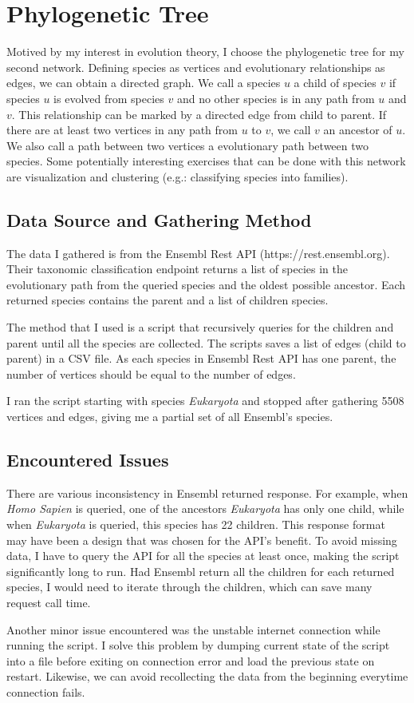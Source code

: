 \documentclass[10pt]{article}
\begin{document}
\section{Phylogenetic Tree}

Motived by my interest in evolution theory, I choose the phylogenetic tree for my second network. Defining species as vertices and evolutionary relationships as edges, we can obtain a directed graph. We call a species $u$ a child of species $v$ if species $u$ is evolved from species $v$ and no other species is in any path from $u$ and $v$. This relationship can be marked by a directed edge from child to parent. If there are at least two vertices in any path from $u$ to $v$, we call $v$ an ancestor of $u$. We also call a path between two vertices a evolutionary path between two species. Some potentially interesting exercises that can be done with this network are visualization and clustering (e.g.: classifying species into families). 

\subsection{Data Source and Gathering Method}

The data I gathered is from the Ensembl Rest API (https://rest.ensembl.org). Their taxonomic classification endpoint returns a list of species in the evolutionary path from the queried species and the oldest possible ancestor. Each returned species contains the parent and a list of children species.

The method that I used is a script that recursively queries for the children and parent until all the species are collected. The scripts saves a list of edges (child to parent) in a CSV file. As each species in Ensembl Rest API has one parent, the number of vertices should be equal to the number of edges. 

I ran the script starting with species \emph{Eukaryota} and stopped after gathering 5508 vertices and edges, giving me a partial set of all Ensembl's species. 

\subsection{Encountered Issues}

There are various inconsistency in Ensembl returned response. For example, when \emph{Homo Sapien} is queried, one of the ancestors \emph{Eukaryota} has only one child, while when \emph{Eukaryota} is queried, this species has 22 children. This response format may have been a design that was chosen for the API's benefit. To avoid missing data, I have to query the API for all the species at least once, making the script significantly long to run. Had Ensembl return all the children for each returned species, I would need to iterate through the children, which can save many request call time. 

Another minor issue encountered was the unstable internet connection while running the script. I solve this problem by dumping current state of the script into a file before exiting on connection error and load the previous state on restart. Likewise, we can avoid recollecting the data from the beginning everytime connection fails. 
\end{document}
